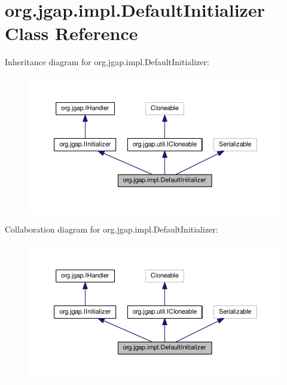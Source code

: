\hypertarget{classorg_1_1jgap_1_1impl_1_1_default_initializer}{\section{org.\-jgap.\-impl.\-Default\-Initializer Class Reference}
\label{classorg_1_1jgap_1_1impl_1_1_default_initializer}
}


Inheritance diagram for org.\-jgap.\-impl.\-Default\-Initializer\-:
\nopagebreak
\begin{figure}[H]
\begin{center}
\leavevmode
\includegraphics[width=350pt]{classorg_1_1jgap_1_1impl_1_1_default_initializer__inherit__graph}
\end{center}
\end{figure}


Collaboration diagram for org.\-jgap.\-impl.\-Default\-Initializer\-:
\nopagebreak
\begin{figure}[H]
\begin{center}
\leavevmode
\includegraphics[width=350pt]{classorg_1_1jgap_1_1impl_1_1_default_initializer__coll__graph}
\end{center}
\end{figure}
